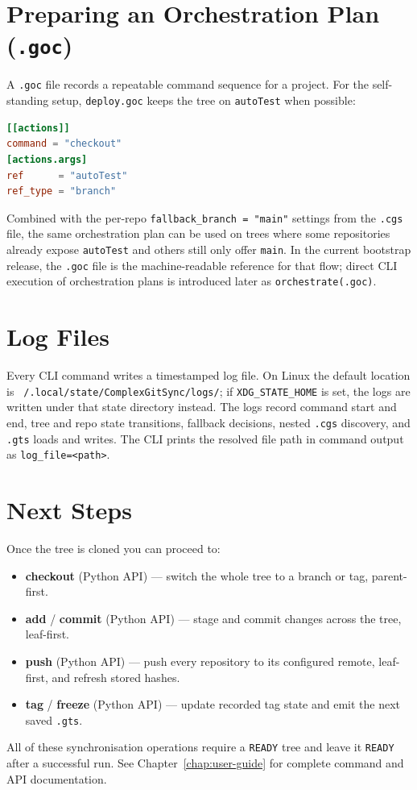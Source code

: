 \section{Preparing an Orchestration Plan (\texttt{.goc})}

A \texttt{.goc} file records a repeatable command sequence for a project.
For the self-standing setup, \texttt{deploy.goc} keeps the tree on
\texttt{autoTest} when possible:

\begin{lstlisting}[language=toml]
[[actions]]
command = "checkout"
[actions.args]
ref      = "autoTest"
ref_type = "branch"
\end{lstlisting}

Combined with the per-repo \texttt{fallback\_branch = "main"} settings from
the \texttt{.cgs} file, the same orchestration plan can be used on trees where
some repositories already expose \texttt{autoTest} and others still only offer
\texttt{main}. In the current bootstrap release, the \texttt{.goc} file is the
machine-readable reference for that flow; direct CLI execution of orchestration
plans is introduced later as \texttt{orchestrate(.goc)}.

\section{Log Files}

Every CLI command writes a timestamped log file. On Linux the default location
is \texttt{~/.local/state/ComplexGitSync/logs/}; if
\texttt{XDG\_STATE\_HOME} is set, the logs are written under that state
directory instead. The logs record command start and end, tree and repo state
transitions, fallback decisions, nested \texttt{.cgs} discovery, and
\texttt{.gts} loads and writes. The CLI prints the resolved file path in
command output as \texttt{log\_file=<path>}.

\section{Next Steps}

Once the tree is cloned you can proceed to:
\begin{itemize}
  \item \textbf{checkout} (Python API) — switch the whole tree to a branch or tag,
    parent-first.
  \item \textbf{add} / \textbf{commit} (Python API) — stage and commit changes
    across the tree, leaf-first.
  \item \textbf{push} (Python API) — push every repository to its configured
    remote, leaf-first, and refresh stored hashes.
  \item \textbf{tag} / \textbf{freeze} (Python API) — update recorded tag state
    and emit the next saved \texttt{.gts}.
\end{itemize}

All of these synchronisation operations require a \texttt{READY} tree and leave it
\texttt{READY} after a successful run.  See Chapter~\ref{chap:user-guide} for
complete command and API documentation.
